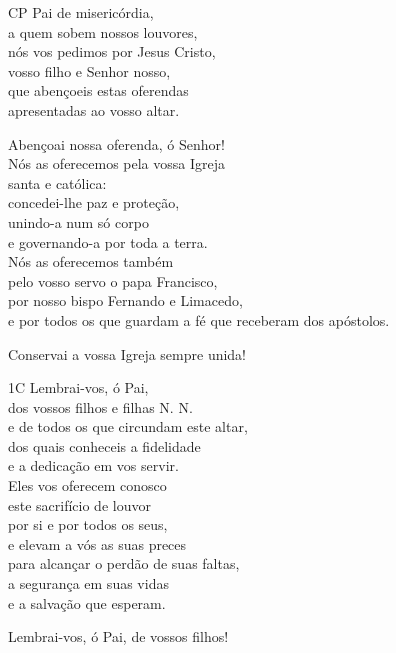 \documentclass{book}
\begin{document}
\begin{flushleft}
    CP Pai de misericórdia, \\
    a quem sobem nossos louvores, \\
    nós vos pedimos por Jesus Cristo, \\
    vosso filho e Senhor nosso, \\
    que abençoeis {\color{red} \grecross} estas oferendas \\
    apresentadas ao vosso altar.

    Abençoai nossa oferenda, ó Senhor! \\

    Nós as oferecemos pela vossa Igreja \\
    santa e católica: \\
    concedei-lhe paz e proteção, \\
    unindo-a num só corpo \\
    e governando-a por toda a terra. \\
    Nós as oferecemos também \\
    pelo vosso servo o papa Francisco, \\
    por nosso bispo Fernando e Limacedo, \\
    e por todos os que guardam a fé que receberam dos apóstolos.

    Conservai a vossa Igreja sempre unida!

    1C Lembrai-vos, ó Pai, \\
    dos vossos filhos e filhas N. N. \\
    e de todos os que circundam este altar, \\
    dos quais conheceis a fidelidade \\
    e a dedicação em vos servir. \\
    Eles vos oferecem conosco \\
    este sacrifício de louvor \\
    por si e por todos os seus, \\
    e elevam a vós as suas preces \\
    para alcançar o perdão de suas faltas, \\
    a segurança em suas vidas \\
    e a salvação que esperam.

    Lembrai-vos, ó Pai, de vossos filhos!


\end{flushleft}
\end{document}
